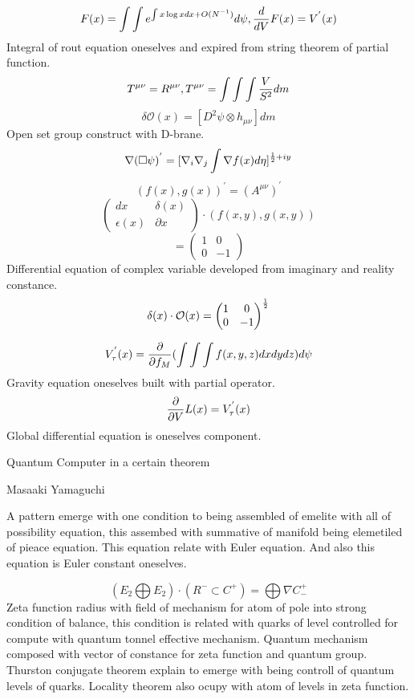 \documentclass{jsarticle}
\begin{document}
{  $$ F(x) = \int \int e^{\int x \log x dx + O(N^{-1})}d \psi, {d \over dV}F(x) = V^{'}(x) $$
  Integral of rout equation oneselves and expired from string theorem of partial function.
  $$ T^{\mu\nu} = R^{\mu\nu}, T^{\mu\nu} = \int \int \int {V \over S^2}dm $$
  $$ \delta \mathcal{O}(x) =
  [D^2 \psi \otimes h_{\mu\nu}]dm$$ 
  Open set group construct with D-brane.
  $$ \nabla(\square \psi)^{'} = [\nabla_{i}\nabla_{j} \int \nabla f(x) d \eta]
  ^{{1 \over 2}+ iy} $$
  $$ \left(f(x), g(x) \right)^{'} = (A^{\mu\nu})^{'} $$
  $$ \begin{pmatrix} dx & \delta(x) \\
  \epsilon(x) & \partial x \end{pmatrix} \cdot \left(f(x,y), g(x,y)\right) $$
  $$ = \begin{pmatrix} 1 & 0 \\
  0 & - 1 \end{pmatrix} $$
  Differential equation of complex variable developed from imaginary and reality constance.
  $$ \delta(x) \cdot \mathcal{O}(x) = \begin{pmatrix} 1 & 0 \\
  0 & - 1 \end{pmatrix}^{1 \over 2} $$

  $$ V^{'}_{\tau}(x) = {\partial \over \partial f_M}(\int \int \int f(x,y,z)dxdydz)d \psi $$
  Gravity equation oneselves built with partial operator.
  $$ {\partial \over \partial V}L(x) = V^{'}_{\tau}(x) $$
  Global differential equation is oneselves component.




\newpage
\begin{center}
\large	Quantum Computer in a certain theorem
\end{center}
\begin{center}
	Masaaki Yamaguchi
\end{center}


A pattern emerge with one condition to being assembled of emelite with all of possibility equation,
this assembed with summative of manifold being elemetiled of pieace equation. This equation relate with Euler equation.
And also this equation is Euler constant oneselves.

$$ (E_2 \bigoplus E_2) \cdot (R^{-} \subset C^{+})  = \bigoplus \nabla C^{+}_{-} $$
Zeta function radius with field of mechanism for atom of pole into strong condition of balance,
this condition is related with quarks of level controlled for compute with quantum tonnel effective mechanism.
Quantum mechanism composed with vector of constance for zeta function and quantum group.
Thurston conjugate theorem explain to emerge with being controll of quantum levels of quarks.
Locality theorem also ocupy with atom of levels in zeta function.

}
\end{document}
